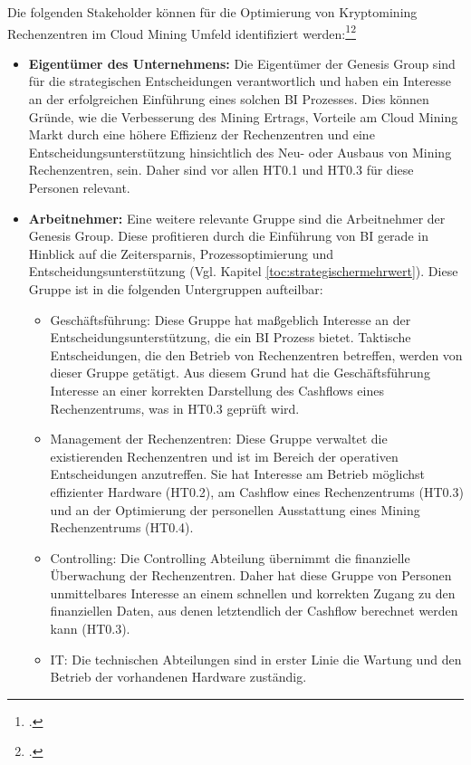 Die folgenden Stakeholder können für die Optimierung von Kryptomining Rechenzentren im Cloud Mining Umfeld identifiziert
werden:\footcite[Vgl.][Abb. 14.2]{simmers2004stakeholder}\footcite[Vgl.][S. 52]{reed2009s}
\begin{itemize}
    \item \textbf{Eigentümer des Unternehmens: }Die Eigentümer der Genesis Group sind für die strategischen Entscheidungen verantwortlich und
    haben ein Interesse an der erfolgreichen Einführung
    eines solchen \ac{BI} Prozesses. Dies können Gründe, wie die Verbesserung des Mining Ertrags, Vorteile am Cloud Mining Markt
    durch eine höhere Effizienz der Rechenzentren und eine Entscheidungsunterstützung hinsichtlich des Neu- oder Ausbaus von Mining
    Rechenzentren, sein. Daher sind vor allen \ac{HT0.1} und \ac{HT0.3} für diese Personen relevant.
    \item \textbf{Arbeitnehmer: }Eine weitere relevante Gruppe sind die Arbeitnehmer der Genesis Group. Diese profitieren
    durch die Einführung von \ac{BI} gerade in Hinblick auf die Zeitersparnis, Prozessoptimierung und
    Entscheidungsunterstützung (Vgl. Kapitel \ref{toc:strategischermehrwert}). Diese Gruppe ist in die folgenden Untergruppen
    aufteilbar:
    \begin{itemize}
        \item Geschäftsführung: Diese Gruppe hat maßgeblich Interesse an der Entscheidungsunterstützung, die ein \ac{BI} Prozess
        bietet. Taktische Entscheidungen, die den Betrieb von Rechenzentren betreffen, werden von dieser Gruppe
        getätigt. Aus diesem Grund hat die Geschäftsführung Interesse an einer korrekten Darstellung des Cashflows eines Rechenzentrums, was
        in \ac{HT0.3} geprüft wird.
        \item Management der Rechenzentren: Diese Gruppe verwaltet die existierenden Rechenzentren und ist im Bereich
        der operativen Entscheidungen anzutreffen. Sie hat Interesse am Betrieb möglichst effizienter Hardware (\ac{HT0.2}),
        am Cashflow eines Rechenzentrums (\ac{HT0.3}) und an der Optimierung der personellen Ausstattung eines Mining Rechenzentrums
        (\ac{HT0.4}).
        \item Controlling: Die Controlling Abteilung übernimmt die finanzielle Überwachung der Rechenzentren. Daher hat diese
        Gruppe von Personen unmittelbares Interesse an einem schnellen und korrekten Zugang zu den finanziellen Daten, aus denen
        letztendlich der Cashflow berechnet werden kann (\ac{HT0.3}).
        \item IT: Die technischen Abteilungen sind in erster Linie die Wartung und den Betrieb der vorhandenen Hardware zuständig.

\end{itemize}
\end{itemize}
